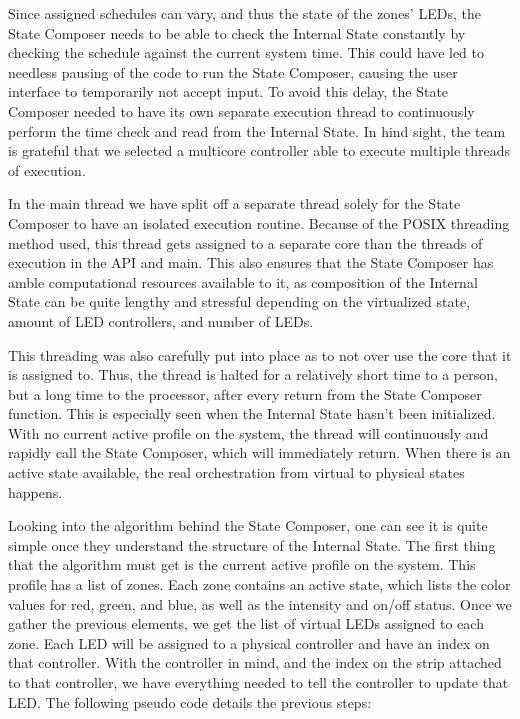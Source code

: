 \documentclass[onecolumn, draftclsnofoot,10pt, compsoc]{IEEEtran}
\begin{document}
	\noindent Since assigned schedules can vary, and thus the state of the zones’ LEDs, the State Composer needs to be able to check the 
	Internal State constantly by checking the schedule against the current system time. This could have led to needless pausing of the code 
	to run the State Composer, causing the user interface to temporarily not accept input. To avoid this delay, the State Composer needed to 
	have its own separate execution thread to continuously perform the time check and read from the Internal State. In hind sight, the team 
	is grateful that we selected a multicore controller able to execute multiple threads of execution.

	\noindent In the main thread we have split off a separate thread solely for the State Composer to have an isolated execution routine. 
	Because of the POSIX threading method used, this thread gets assigned to a separate core than the threads of execution in the API and main. 
	This also ensures that the State Composer has amble computational resources available to it, as composition of the Internal State can be 
	quite lengthy and stressful depending on the virtualized state, amount of LED controllers, and number of LEDs.  

	\noindent This threading was also carefully put into place as to not over use the core that it is assigned to. 
	Thus, the thread is halted for a relatively short time to a person, but a long time to the processor, after every return from the State 
	Composer function. This is especially seen when the Internal State hasn’t been initialized. With no current active profile on the system, 
	the thread will continuously and rapidly call the State Composer, which will immediately return. When there is an active state available, 
	the real orchestration from virtual to physical states happens.  

	\noindent Looking into the algorithm behind the State Composer, one can see it is quite simple once they understand the structure of the 
	Internal State. The first thing that the algorithm must get is the current active profile on the system.  This profile has a list of zones. 
	Each zone contains an active state, which lists the color values for red, green, and blue, as well as the intensity and on/off status. Once 
	we gather the previous elements, we get the list of virtual LEDs assigned to each zone. Each LED will be assigned to a physical controller 
	and have an index on that controller. With the controller in mind, and the index on the strip attached to that controller, we have everything 
	needed to tell the controller to update that LED. The following pseudo code details the previous steps: 
\end{document}
